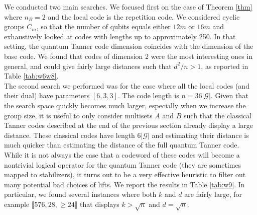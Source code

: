 \documentclass[a4paper,onecolumn,11pt]{quantumarticle}
\def\G{\mathcal{G}}
\begin{document}
We conducted two main searches. We focused first on the case of Theorem \ref{thm} where $n_B=2$ and the local code is the repetition code. We considered cyclic groups $C_m$, so that the number of qubits equals either $12m$ or $16m$ and exhaustively looked at codes with lengths up to approximately 250. In that setting, the quantum Tanner code dimension coincides with the dimension of the base code. We found that codes of dimension 2 were the most interesting ones in general, and could give fairly large distances such that $d^2/n > 1$, as reported in Table \ref{tab:w6w8}.\\

The second search we performed was for the case where all the local codes (and their dual) have parameters $[6,3,3]$. The code length is $n=36 |\G|$. Given that the search space quickly becomes much larger, especially when we increase the group size, it is useful to only consider multisets $A$ and $B$ such that the classical Tanner codes described at the end of the previous section already display a large distance. These classical codes have length $6|\G|$ and estimating their distance is much quicker than estimating the distance of the full quantum Tanner code. While it is not always the case that a codeword of these codes will become a nontrivial logical operator for the quantum Tanner code (they are sometimes mapped to stabilizers), it turns out to be a very effective heuristic to filter out many potential bad choices of lifts. 
We report the results in Table \ref{tab:w9}. In particular, we found several instances where both $k$ and $d$ are fairly large, for example $\llbracket 576, 28, \geq 24\rrbracket$ that displays $k > \sqrt{n}$ and $d = \sqrt{n}$. \\
\end{document}
